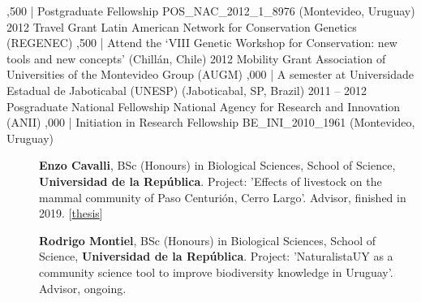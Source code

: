 \documentclass[9pt]{developercv} %
\begin{document}
\begin{entrylist}
		{,500 | Postgraduate Fellowship POS\_NAC\_2012\_1\_8976 (Montevideo, Uruguay)}
	\entry
		{2012}
		{Travel Grant}
		{Latin American Network for Conservation Genetics (REGENEC)}
		{,500 | Attend the ‘VIII Genetic Workshop for Conservation: new tools and new concepts’ (Chillán, Chile)}
	\entry
		{2012}
		{Mobility Grant}
		{Association of Universities of the Montevideo Group (AUGM)}
		{,000 | A semester at Universidade Estadual de Jaboticabal (UNESP) (Jaboticabal, SP, Brazil)}
	\entry
		{2011 -- 2012}
		{Posgraduate National Fellowship}
		{National Agency for Research and Innovation (ANII)}
		{,000 | Initiation in Research Fellowship BE\_INI\_2010\_1961 (Montevideo, Uruguay)}

\end{entrylist}



\begin{description}
\item[]{\bf Enzo Cavalli}, BSc (Honours) in Biological Sciences, School of Science, {\bf Universidad de la Rep\'{u}blica}. Project: 'Effects of livestock on the mammal community of Paso Centurión, Cerro Largo'. Advisor, finished in 2019.  [\href{https://www.colibri.udelar.edu.uy/jspui/bitstream/20.500.12008/23484/6/uy24-19703.pdf}{thesis}]
\item[]{\bf Rodrigo Montiel}, BSc (Honours) in Biological Sciences, School of Science, {\bf Universidad de la Rep\'{u}blica}. Project: 'NaturalistaUY as a community science tool to improve biodiversity knowledge in Uruguay'. Advisor, ongoing.
\end{description}


\end{document}
